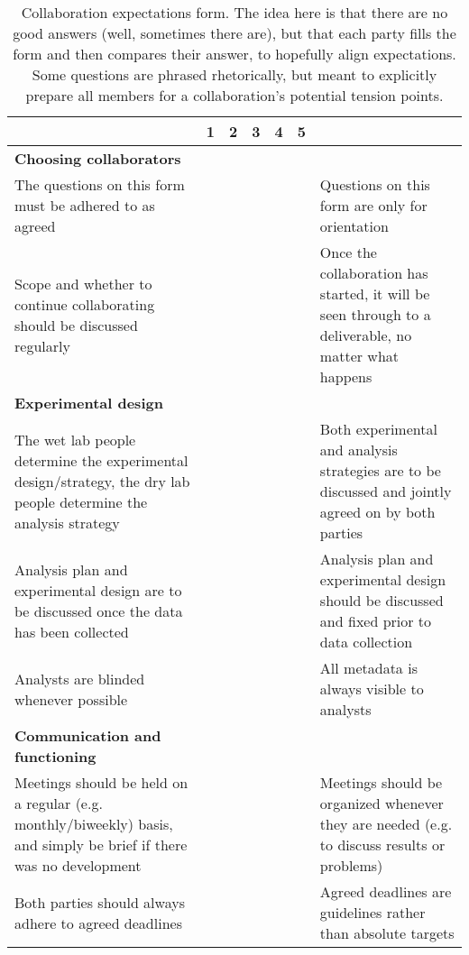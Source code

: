 \setlength\extrarowheight{4pt}

\begin{table}[!ht]
   \caption{Collaboration expectations form. The idea here is that there are no good answers (well, sometimes there are), but that each party fills the form and then compares their answer, to hopefully align expectations. Some questions are phrased rhetorically, but meant to explicitly prepare all members for a collaboration's potential tension points.}
    \label{form}
    \raggedleft
    \begin{adjustbox}{max width=\textwidth}
    \begin{tabular}{|p{3in}|l|l|l|l|l|p{3in}|}
    \hline
        ~ & 1 & 2 & 3 & 4 & 5 & ~ \tabularnewline \hline
        \textbf{Choosing collaborators} & ~ & ~ & ~ & ~ & ~ & ~ \tabularnewline \hline
        The questions on this form must be adhered to as agreed & ~ & ~ & ~ & ~ & ~ & Questions on this form are only for orientation \\ \hline
        Scope and whether to continue collaborating should be discussed regularly & ~ & ~ & ~ & ~ & ~ & Once the collaboration has started, it will be seen through to a deliverable, no matter what happens \\ \hline
        \textbf{Experimental design} & ~ & ~ & ~ & ~ & ~ & ~ \\ \hline
        The wet lab people determine the experimental design/strategy, the dry lab people determine the analysis strategy & ~ & ~ & ~ & ~ & ~ & Both experimental and analysis strategies are to be discussed and jointly agreed on by both parties \\ \hline
        Analysis plan and experimental design are to be discussed once the data has been collected & ~ & ~ & ~ & ~ & ~ & Analysis plan and experimental design should be discussed and fixed prior to data collection \\ \hline
        Analysts are blinded whenever possible & ~ & ~ & ~ & ~ & ~ & All metadata is always visible to analysts \\ \hline
        \textbf{Communication and functioning} & ~ & ~ & ~ & ~ & ~ & ~ \\ \hline
        Meetings should be held on a regular (e.g. monthly/biweekly) basis, and simply be brief if there was no development & ~ & ~ & ~ & ~ & ~ & Meetings should be organized whenever they are needed (e.g. to discuss results or problems) \\ \hline
        Both parties should always adhere to agreed deadlines & ~ & ~ & ~ & ~ & ~ & Agreed deadlines are guidelines rather than absolute targets \\ \hline

\end{tabular}
\end{adjustbox}
\end{table}
